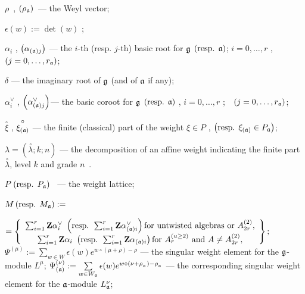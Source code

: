 \documentclass[a4paper,12pt]{article}
\theoremstyle{definition} \newtheorem{Def}{Definition}
\begin{document}
$\rho $\ , $\left( \rho _{\frak{a}}\right) $\ --- the Weyl vector;

$\epsilon \left( w\right) :=\det \left( w\right) $ ;

$\alpha _{i}$ , $\left( \alpha _{\left( \frak{a}\right) j}\right) $ --- the $i
$-th (resp. $j$-th) basic root for $\frak{g}$ $\left( \text{resp. }\frak{a}%
\right) $; $i=0,\ldots ,r$ ,\ \ $\left( j=0,\ldots ,r_{\frak{a}}\right) $;

$\delta $ --- the imaginary root of $\frak{g}$ (and of $\frak{a}$ if any);

$\alpha _{i}^{\vee }$ , $\left( \alpha _{\left( \frak{a}\right) j}^{\vee
}\right) $--- the basic coroot for $\frak{g}$ $\left( \text{resp. }\frak{a}%
\right) $ , $i=0,\ldots ,r$ ;\ \ $\left( j=0,\ldots ,r_{\frak{a}}\right) $;

$\overset{\circ }{\xi }$ , $\overset{\circ }{\xi _{\left( \frak{a}\right) }}$
--- the finite (classical) part of the weight $\xi \in P$ , $\left( \text{%
resp. }\xi _{\left( \frak{a}\right) }\in P_{\frak{a}}\right) $;

$\lambda =\left( \overset{\circ }{\lambda };k;n\right) $ --- the
decomposition of an affine weight indicating the finite part $\overset{\circ
}{\lambda }$, level $k$ and grade $n$\ .

$P$ $\left( \text{resp. } P_{\frak{a}}\right) $ \ --- the weight lattice;

$M \left( \text{resp. }M_{\frak{a}}\right) :=$

\noindent $=\left\{
\begin{array}{c}
\sum_{i=1}^{r}\mathbf{Z}\alpha _{i}^{\vee }\text{ }\left( \text{resp. }%
\sum_{i=1}^{r}\mathbf{Z}\alpha _{\left( \frak{a}\right) i}^{\vee }\right)
\text{for untwisted algebras or }A_{2r}^{\left( 2\right) }, \\
\sum_{i=1}^{r}\mathbf{Z}\alpha _{i}\text{ }\left( \text{resp. }\sum_{i=1}^{r}%
\mathbf{Z}\alpha _{\left( \frak{a}\right) i}\right) \text{for }A_{r}^{\left(
u\geq 2\right) }\text{ and }A\neq A_{2r}^{\left( 2\right) },
\end{array}
\right\} ;$
$\Psi ^{\left( \mu \right) }:=\sum\limits_{w\in W}\epsilon (w)e^{w\circ (\mu +\rho )-\rho }$ --- the singular weight element for the $\frak{g}$-module $L^{\mu }$;
$\Psi _{\left( \frak{a}\right) }^{\left( \nu \right) }:=\sum\limits_{w\in W_{\frak{a}}}\epsilon (w)e^{w\circ (\nu +\rho
_{_{\frak{a}}})-\rho _{_{\frak{a}}}}$ --- the corresponding singular weight
element for the $\frak{a}$-module $L_{\frak{a}}^{\nu }$;
\end{document}
